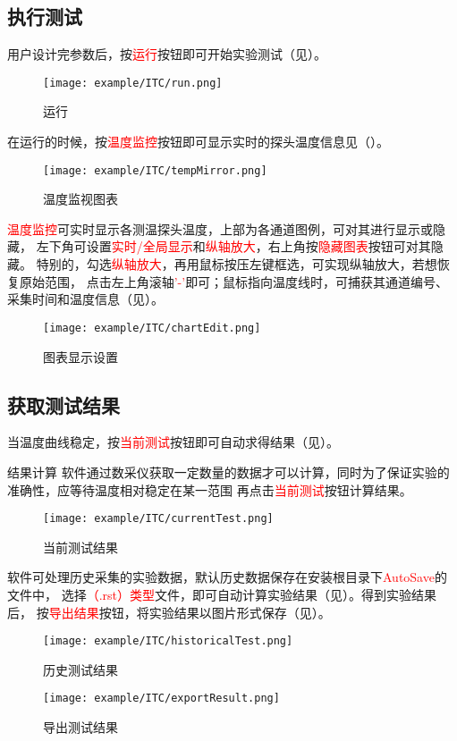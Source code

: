 \subsection{执行测试}
用户设计完参数后，按\textcolor{red}{运行}按钮即可开始实验测试（见）。
\begin{figure}[H]
	\centering
	\texttt{[image: example/ITC/run.png]}
	\caption{ 运行 \label{fig:exmp_itc_run}}
\end{figure}
在运行的时候，按\textcolor{red}{温度监控}按钮即可显示实时的探头温度信息见（）。
\begin{figure}[H]
	\centering
	\texttt{[image: example/ITC/tempMirror.png]}
	\caption{ 温度监视图表 \label{fig:exmp_itc_tempMirror}}
\end{figure}
\textcolor{red}{温度监控}可实时显示各测温探头温度，上部为各通道图例，可对其进行显示或隐藏，
左下角可设置\textcolor{red}{实时/全局显示}和\textcolor{red}{纵轴放大}，右上角按\textcolor{red}{隐藏图表}按钮可对其隐藏。
特别的，勾选\textcolor{red}{纵轴放大}，再用鼠标按压左键框选，可实现纵轴放大，若想恢复原始范围，
点击左上角滚轴\textcolor{red}{'-'}即可；鼠标指向温度线时，可捕获其通道编号、采集时间和温度信息（见）。\\
\begin{figure}[H]
	\centering
	\texttt{[image: example/ITC/chartEdit.png]}
	\caption{ 图表显示设置 \label{fig:exmp_itc_chartEdit}}
\end{figure}

\subsection{获取测试结果}
	当温度曲线稳定，按\textcolor{red}{当前测试}按钮即可自动求得结果（见）。
\begin{tips}{结果计算}
	软件通过数采仪获取一定数量的数据才可以计算，同时为了保证实验的准确性，应等待温度相对稳定在某一范围
再点击\textcolor{red}{当前测试}按钮计算结果。
\end{tips}
\begin{figure}[H]
	\centering
	\texttt{[image: example/ITC/currentTest.png]}
	\caption{ 当前测试结果 \label{fig:exmp_itc_currentTest}}
\end{figure}
软件可处理历史采集的实验数据，默认历史数据保存在安装根目录下\textcolor{red}{AutoSave}的文件中，
选择\textcolor{red}{（.rst）类型}文件，即可自动计算实验结果（见）。得到实验结果后，
按\textcolor{red}{导出结果}按钮，将实验结果以图片形式保存（见）。
\begin{figure}[H]
	\centering
	\texttt{[image: example/ITC/historicalTest.png]}
	\caption{ 历史测试结果 \label{fig:exmp_itc_historicalTest}}
\end{figure}

\begin{figure}[H]
	\centering
	\texttt{[image: example/ITC/exportResult.png]}
	\caption{ 导出测试结果 \label{fig:exmp_itc_exportResult}}
\end{figure}